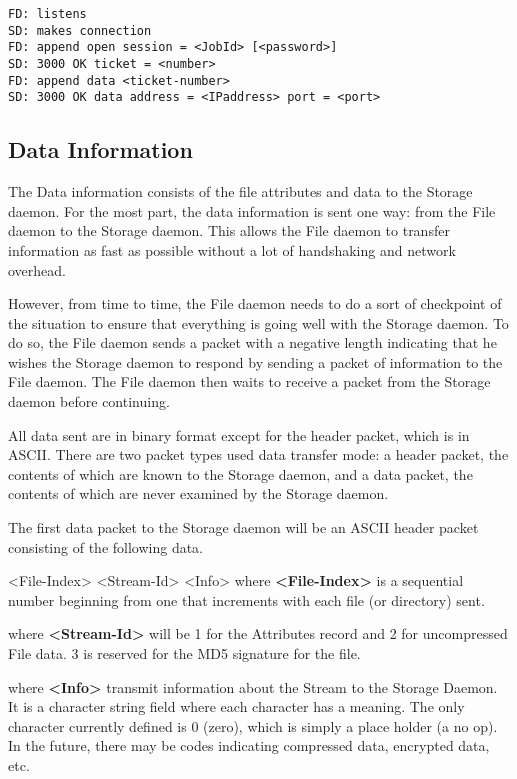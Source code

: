 \footnotesize
\begin{verbatim}
FD: listens
SD: makes connection
FD: append open session = <JobId> [<password>]
SD: 3000 OK ticket = <number>
FD: append data <ticket-number>
SD: 3000 OK data address = <IPaddress> port = <port>
\end{verbatim}
\normalsize

\subsection{Data Information}

The Data information consists of the file attributes and data to the Storage
daemon. For the most part, the data information is sent one way: from the File
daemon to the Storage daemon. This allows the File daemon to transfer
information as fast as possible without a lot of handshaking and network
overhead.

However, from time to time, the File daemon needs to do a sort of checkpoint
of the situation to ensure that everything is going well with the Storage
daemon. To do so, the File daemon sends a packet with a negative length
indicating that he wishes the Storage daemon to respond by sending a packet of
information to the File daemon. The File daemon then waits to receive a packet
from the Storage daemon before continuing.

All data sent are in binary format except for the header packet, which is in
ASCII. There are two packet types used data transfer mode: a header packet,
the contents of which are known to the Storage daemon, and a data packet, the
contents of which are never examined by the Storage daemon.

The first data packet to the Storage daemon will be an ASCII header packet
consisting of the following data.

{\textless}File-Index{\textgreater} {\textless}Stream-Id{\textgreater} {\textless}Info{\textgreater} where {\bf
{\textless}File-Index{\textgreater}} is a sequential number beginning from one that
increments with each file (or directory) sent.

where {\bf {\textless}Stream-Id{\textgreater}} will be 1 for the Attributes record and 2 for
uncompressed File data. 3 is reserved for the MD5 signature for the file.

where {\bf {\textless}Info{\textgreater}} transmit information about the Stream to the
Storage Daemon. It is a character string field where each character has a
meaning. The only character currently defined is 0 (zero), which is simply a
place holder (a no op). In the future, there may be codes indicating
compressed data, encrypted data, etc.

